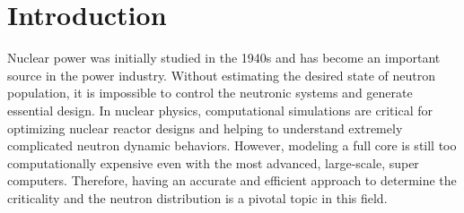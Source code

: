
\cleardoublepage


\chapter{Introduction}
\label{chapter:intro}
Nuclear power was initially studied in the 1940s and has become an important source in the power industry.
Without estimating the desired state of neutron population, it is impossible to control the neutronic systems and generate essential design. 
In nuclear physics, computational simulations are critical for optimizing nuclear reactor designs and helping to understand extremely complicated neutron dynamic behaviors.
However, modeling a full core is still too computationally expensive even with the most advanced, large-scale, super computers. 
Therefore, having an accurate and efficient approach to determine the criticality and the neutron distribution is a pivotal topic in this field.

